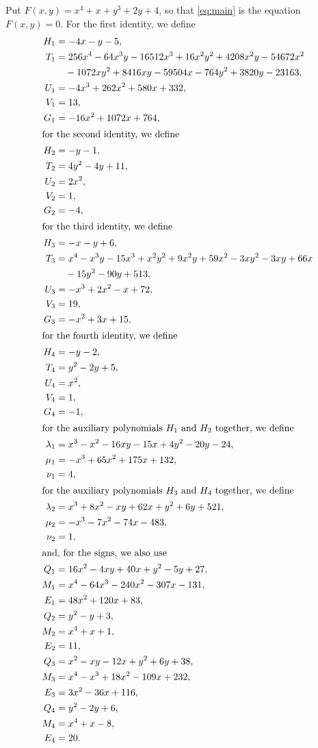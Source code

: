 \documentclass[11pt]{article}
\begin{document}
Put $F(x,y)=x^{4}+x+y^{3}+2y+4$, so that \eqref{eq:main} is the equation $F(x,y)=0$. For the first identity, we define
\begin{align*}
H_{1}&=-4x-y-5,\\
T_{1}&=256x^{4}-64x^{3}y-16512x^{3}+16x^{2}y^{2}+4208x^{2}y-54672x^{2}\\
&\quad-1072xy^{2}+8416xy-59504x-764y^{2}+3820y-23163,\\
U_{1}&=-4x^{3}+262x^{2}+580x+332,\\
V_{1}&=13,\\
G_{1}&=-16x^{2}+1072x+764,\\
\intertext{for the second identity, we define}
H_{2}&=-y-1,\\
T_{2}&=4y^{2}-4y+11,\\
U_{2}&=2x^{2},\\
V_{2}&=1,\\
G_{2}&=-4,\\
\intertext{for the third identity, we define}
H_{3}&=-x-y+6,\\
T_{3}&=x^{4}-x^{3}y-15x^{3}+x^{2}y^{2}+9x^{2}y+59x^{2}-3xy^{2}-3xy+66x\\
&\quad-15y^{2}-90y+513,\\
U_{3}&=-x^{3}+2x^{2}-x+72,\\
V_{3}&=19,\\
G_{3}&=-x^{2}+3x+15,\\
\intertext{for the fourth identity, we define}
H_{4}&=-y-2,\\
T_{4}&=y^{2}-2y+5,\\
U_{4}&=x^{2},\\
V_{4}&=1,\\
G_{4}&=-1,\\
\intertext{for the auxiliary polynomials $H_{1}$ and $H_{2}$ together, we define}
\lambda_{1}&=x^{3}-x^{2}-16xy-15x+4y^{2}-20y-24,\\
\mu_{1}&=-x^{3}+65x^{2}+175x+132,\\
\nu_{1}&=4,\\
\intertext{for the auxiliary polynomials $H_{3}$ and $H_{4}$ together, we define}
\lambda_{2}&=x^{3}+8x^{2}-xy+62x+y^{2}+6y+521,\\
\mu_{2}&=-x^{3}-7x^{2}-74x-483,\\
\nu_{2}&=1,\\
\intertext{and, for the signs, we also use}
Q_{1}&=16x^{2}-4xy+40x+y^{2}-5y+27,\\
M_{1}&=x^{4}-64x^{3}-240x^{2}-307x-131,\\
E_{1}&=48x^{2}+120x+83,\\
Q_{2}&=y^{2}-y+3,\\
M_{2}&=x^{4}+x+1,\\
E_{2}&=11,\\
Q_{3}&=x^{2}-xy-12x+y^{2}+6y+38,\\
M_{3}&=x^{4}-x^{3}+18x^{2}-109x+232,\\
E_{3}&=3x^{2}-36x+116,\\
Q_{4}&=y^{2}-2y+6,\\
M_{4}&=x^{4}+x-8,\\
E_{4}&=20.
\end{align*}
\end{document}
